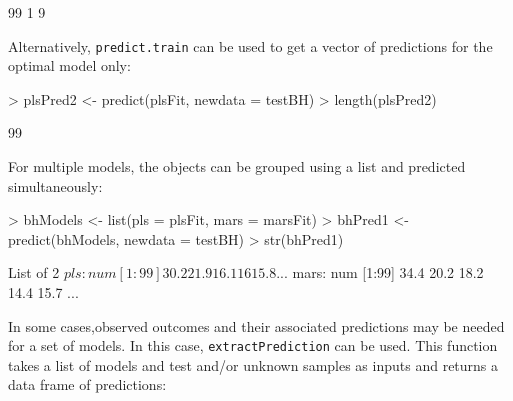 \documentclass[12pt]{article}
\begin{document}
\begin{small}
\begin{Schunk}
\begin{Soutput}
[1] 99  1  9
\end{Soutput}
\end{Schunk}
\end{small}
Alternatively, \texttt{predict.train} can be used to get a vector of predictions for the optimal model only:
\begin{small}
\begin{Schunk}
\begin{Sinput}
> plsPred2 <- predict(plsFit, newdata = testBH)
> length(plsPred2)
\end{Sinput}
\begin{Soutput}
[1] 99
\end{Soutput}
\end{Schunk}
\end{small}
For multiple models, the objects can be grouped using a list and predicted simultaneously:
\begin{small}
\begin{Schunk}
\begin{Sinput}
> bhModels <- list(pls = plsFit, mars = marsFit)
> bhPred1 <- predict(bhModels, newdata = testBH)
> str(bhPred1)
\end{Sinput}
\begin{Soutput}
List of 2
 $ pls : num [1:99] 30.2 21.9 16.1 16 15.8 ...
 $ mars: num [1:99] 34.4 20.2 18.2 14.4 15.7 ...
\end{Soutput}
\end{Schunk}
\end{small}
In some cases,observed outcomes and their associated predictions may be needed for a set of models. In this case, \texttt{extractPrediction} can be used. This function takes a list of models and test and/or unknown samples as inputs and returns a data frame of predictions:
\end{document}
